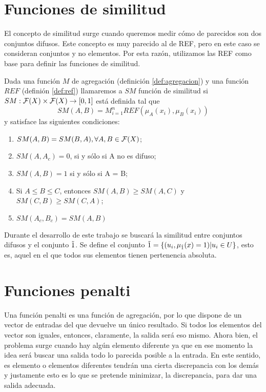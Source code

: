 \section{Funciones de similitud}\label{sec:similitud}
El concepto de similitud \cite{art:fan1, art:fan2} surge cuando queremos medir cómo de parecidos son dos conjuntos difusos. Este concepto es muy parecido al de REF, pero en este caso se consideran conjuntos y no elementos. Por esta razón, utilizamos las REF como base para definir las funciones de similitud.
\begin{definition}\label{def:similitud}
Dada una función $M$ de agregación (definición \ref{def:agregacion}) y una función $REF$ (definión \ref{def:ref}) llamaremos a $SM$ función de similitud si $SM : \mathcal{F}(X) \times \mathcal{F}(X) \rightarrow [0,1]$ está definida tal que 
$$SM(A,B)=M^n_{i=1}REF(\mu_A(x_i), \mu_B(x_i))$$
y satisface las siguientes condiciones:
	\begin{enumerate}
	\item $SM(A, B) = SM(B, A), \forall A, B \in \mathcal{F}(X)$;
	\item $SM(A, A_c) = 0$, si y sólo si A no es difuso;
	\item $SM(A, B) = 1$ si y sólo si A = B;
	\item Si $A\leq B\leq C$, entonces $SM(A, B)\geq SM(A,C)$ y $SM(C, B)\geq SM(C,A)$;
	\item $SM(A_c, B_c) = SM(A,B)$
	\end{enumerate}	
\end{definition}

\begin{remark}
Durante el desarrollo de este trabajo se buscará la similitud entre conjuntos difusos y el conjunto $\tilda1$. Se define el conjunto $\tilda1 =\{(u_{i}, \mu_{\tilda1}(x)=1)|u_{i}\in U \}$, esto es, aquel en el que todos sus elementos tienen pertenencia absoluta.
\end{remark}


\section{Funciones penalti}\label{sec:penalti}
Una función penalti  \cite{art:calvo} es una función de agregación, por lo que dispone de un vector de entradas del que devuelve un único resultado. Si todos los elementos del vector son iguales, entonces, claramente, la salida será eso mismo. Ahora bien, el problema surge cuando hay algún elemento diferente ya que en ese momento la idea será buscar una salida todo lo parecida posible a la entrada. En este sentido, es elemento o elementos diferentes tendrán una cierta discrepancia con los demás y justamente esto es lo que se pretende minimizar, la discrepancia, para dar una salida adecuada. 

